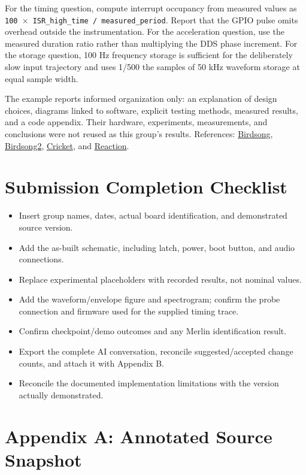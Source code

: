 \documentclass[11pt,letterpaper]{article}
\begin{document}
For the timing question, compute interrupt occupancy from measured values as \texttt{100 \ensuremath{\times} ISR\_high\_time / measured\_period}. Report that the GPIO pulse omits overhead outside the instrumentation. For the acceleration question, use the measured duration ratio rather than multiplying the DDS phase increment. For the storage question, 100 Hz frequency storage is sufficient for the deliberately slow input trajectory and uses 1/500 the samples of 50 kHz waveform storage at equal sample width.

The example reports informed organization only: an explanation of design choices, diagrams linked to software, explicit testing methods, measured results, and a code appendix. Their hardware, experiments, measurements, and conclusions were not reused as this group's results. References: \href{https://vanhunteradams.com/Pico/CourseMaterials/Birdsong.pdf}{Birdsong}, \href{https://vanhunteradams.com/Pico/CourseMaterials/Birdsong2.pdf}{Birdsong2}, \href{https://vanhunteradams.com/Pico/CourseMaterials/cricket.pdf}{Cricket}, and \href{https://vanhunteradams.com/Pico/CourseMaterials/reaction.pdf}{Reaction}.

\section*{Submission Completion Checklist}

\begin{itemize}
\item Insert group names, dates, actual board identification, and demonstrated source version.
\item Add the as-built schematic, including latch, power, boot button, and audio connections.
\item Replace experimental placeholders with recorded results, not nominal values.
\item Add the waveform/envelope figure and spectrogram; confirm the probe connection and firmware used for the supplied timing trace.
\item Confirm checkpoint/demo outcomes and any Merlin identification result.
\item Export the complete AI conversation, reconcile suggested/accepted change counts, and attach it with Appendix B.
\item Reconcile the documented implementation limitations with the version actually demonstrated.
\end{itemize}

\clearpage
\section*{Appendix A: Annotated Source Snapshot}
\end{document}
